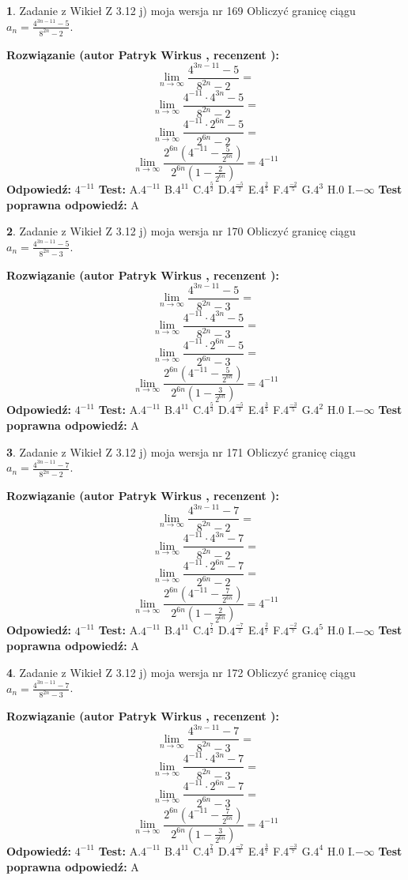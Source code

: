 \documentclass[12pt, a4paper]{article}
\theoremstyle{definition} %
\newtheorem{zad}{}
\newcommand{\zadStart}[1]{\begin{zad}#1\newline}
\newcommand{\zadStop}{\end{zad}}
\newcommand{\rozwStart}[2]{\noindent \textbf{Rozwiązanie (autor #1 , recenzent #2): }\newline}
\newcommand{\rozwStop}{\newline}
\newcommand{\odpStart}{\noindent \textbf{Odpowiedź:}\newline}
\newcommand{\odpStop}{\newline}
\newcommand{\testStart}{\noindent \textbf{Test:}\newline}
\newcommand{\testStop}{\newline}
\newcommand{\kluczStart}{\noindent \textbf{Test poprawna odpowiedź:}\newline}
\newcommand{\kluczStop}{\newline}
\begin{document}
\zadStart{Zadanie z Wikieł Z 3.12 j) moja wersja nr 169}
Obliczyć granicę ciągu $a_{n}=\frac{4^{3n-11}-5}{8^{2n}-2}$.
\zadStop
\rozwStart{Patryk Wirkus}{}
$$\lim\limits_{n\to\infty}\frac{4^{3n-11}-5}{8^{2n}-2}=$$
$$\lim\limits_{n\to\infty}\frac{4^{-11} \cdot 4^{3n}-5}{8^{2n}-2}=$$
$$\lim\limits_{n\to\infty}\frac{4^{-11} \cdot 2^{6n}-5}{2^{6n}-2}=$$
$$\lim\limits_{n\to\infty}\frac{2^{6n}(4^{-11} - \frac{5}{2^{6n}})}{2^{6n}(1-\frac{2}{2^{6n}})}= 4^{-11}$$
\rozwStop
\odpStart
$4^{-11}$
\odpStop
\testStart
A.$4^{-11}$
B.$4^{11}$
C.$4^{\frac{5}{2}}$
D.$4^{\frac{-5}{2}}$
E.$4^{\frac{2}{5}}$
F.$4^{\frac{-2}{5}}$
G.$4^{3}$
H.$0$
I.$-\infty$
\testStop
\kluczStart
A
\kluczStop



\zadStart{Zadanie z Wikieł Z 3.12 j) moja wersja nr 170}
Obliczyć granicę ciągu $a_{n}=\frac{4^{3n-11}-5}{8^{2n}-3}$.
\zadStop
\rozwStart{Patryk Wirkus}{}
$$\lim\limits_{n\to\infty}\frac{4^{3n-11}-5}{8^{2n}-3}=$$
$$\lim\limits_{n\to\infty}\frac{4^{-11} \cdot 4^{3n}-5}{8^{2n}-3}=$$
$$\lim\limits_{n\to\infty}\frac{4^{-11} \cdot 2^{6n}-5}{2^{6n}-3}=$$
$$\lim\limits_{n\to\infty}\frac{2^{6n}(4^{-11} - \frac{5}{2^{6n}})}{2^{6n}(1-\frac{3}{2^{6n}})}= 4^{-11}$$
\rozwStop
\odpStart
$4^{-11}$
\odpStop
\testStart
A.$4^{-11}$
B.$4^{11}$
C.$4^{\frac{5}{3}}$
D.$4^{\frac{-5}{3}}$
E.$4^{\frac{3}{5}}$
F.$4^{\frac{-3}{5}}$
G.$4^{2}$
H.$0$
I.$-\infty$
\testStop
\kluczStart
A
\kluczStop



\zadStart{Zadanie z Wikieł Z 3.12 j) moja wersja nr 171}
Obliczyć granicę ciągu $a_{n}=\frac{4^{3n-11}-7}{8^{2n}-2}$.
\zadStop
\rozwStart{Patryk Wirkus}{}
$$\lim\limits_{n\to\infty}\frac{4^{3n-11}-7}{8^{2n}-2}=$$
$$\lim\limits_{n\to\infty}\frac{4^{-11} \cdot 4^{3n}-7}{8^{2n}-2}=$$
$$\lim\limits_{n\to\infty}\frac{4^{-11} \cdot 2^{6n}-7}{2^{6n}-2}=$$
$$\lim\limits_{n\to\infty}\frac{2^{6n}(4^{-11} - \frac{7}{2^{6n}})}{2^{6n}(1-\frac{2}{2^{6n}})}= 4^{-11}$$
\rozwStop
\odpStart
$4^{-11}$
\odpStop
\testStart
A.$4^{-11}$
B.$4^{11}$
C.$4^{\frac{7}{2}}$
D.$4^{\frac{-7}{2}}$
E.$4^{\frac{2}{7}}$
F.$4^{\frac{-2}{7}}$
G.$4^{5}$
H.$0$
I.$-\infty$
\testStop
\kluczStart
A
\kluczStop



\zadStart{Zadanie z Wikieł Z 3.12 j) moja wersja nr 172}
Obliczyć granicę ciągu $a_{n}=\frac{4^{3n-11}-7}{8^{2n}-3}$.
\zadStop
\rozwStart{Patryk Wirkus}{}
$$\lim\limits_{n\to\infty}\frac{4^{3n-11}-7}{8^{2n}-3}=$$
$$\lim\limits_{n\to\infty}\frac{4^{-11} \cdot 4^{3n}-7}{8^{2n}-3}=$$
$$\lim\limits_{n\to\infty}\frac{4^{-11} \cdot 2^{6n}-7}{2^{6n}-3}=$$
$$\lim\limits_{n\to\infty}\frac{2^{6n}(4^{-11} - \frac{7}{2^{6n}})}{2^{6n}(1-\frac{3}{2^{6n}})}= 4^{-11}$$
\rozwStop
\odpStart
$4^{-11}$
\odpStop
\testStart
A.$4^{-11}$
B.$4^{11}$
C.$4^{\frac{7}{3}}$
D.$4^{\frac{-7}{3}}$
E.$4^{\frac{3}{7}}$
F.$4^{\frac{-3}{7}}$
G.$4^{4}$
H.$0$
I.$-\infty$
\testStop
\kluczStart
A
\kluczStop
\end{document}
